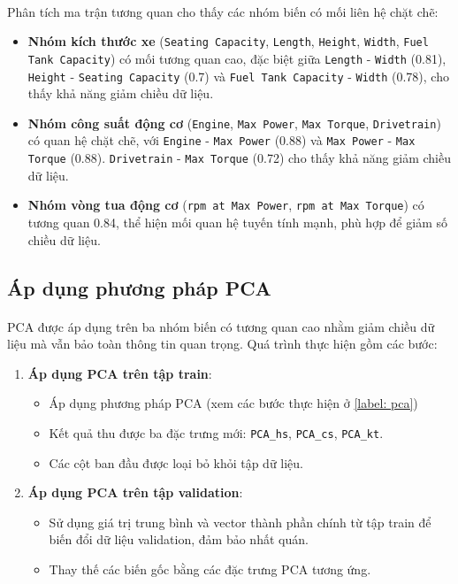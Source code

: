 \paragraph{}{Phân tích ma trận tương quan cho thấy các nhóm biến có mối liên hệ chặt chẽ:}
\begin{itemize}
    \item \textbf{Nhóm kích thước xe} (\texttt{Seating Capacity}, \texttt{Length}, \texttt{Height}, \texttt{Width}, \texttt{Fuel Tank Capacity}) có mối tương quan cao, đặc biệt giữa \texttt{Length} - \texttt{Width} (0.81), \texttt{Height} - \texttt{Seating Capacity} (0.7) và \texttt{Fuel Tank Capacity} - \texttt{Width} (0.78), cho thấy khả năng giảm chiều dữ liệu.
    \item \textbf{Nhóm công suất động cơ} (\texttt{Engine}, \texttt{Max Power}, \texttt{Max Torque}, \texttt{Drivetrain}) có quan hệ chặt chẽ, với \texttt{Engine} - \texttt{Max Power} (0.88) và \texttt{Max Power} - \texttt{Max Torque} (0.88). \texttt{Drivetrain} - \texttt{Max Torque} (0.72) cho thấy khả năng giảm chiều dữ liệu.
    \item \textbf{Nhóm vòng tua động cơ} (\texttt{rpm at Max Power}, \texttt{rpm at Max Torque}) có tương quan 0.84, thể hiện mối quan hệ tuyến tính mạnh, phù hợp để giảm số chiều dữ liệu.
\end{itemize}

\subsection{Áp dụng phương pháp PCA}
\label{label: PCA}
\label{subsec:apply_pca}

\paragraph{}{PCA được áp dụng trên ba nhóm biến có tương quan cao nhằm giảm chiều dữ liệu mà vẫn bảo toàn thông tin quan trọng. Quá trình thực hiện gồm các bước:}

\begin{enumerate}
    \item \textbf{Áp dụng PCA trên tập train}:
    \begin{itemize}
        \item Áp dụng phương pháp PCA (xem các bước thực hiện ở \ref{label: pca})
        \item Kết quả thu được ba đặc trưng mới: \texttt{PCA\_hs}, \texttt{PCA\_cs}, \texttt{PCA\_kt}.
        \item Các cột ban đầu được loại bỏ khỏi tập dữ liệu.
    \end{itemize}
    \item \textbf{Áp dụng PCA trên tập validation}:
    \begin{itemize}
        \item Sử dụng giá trị trung bình và vector thành phần chính từ tập train để biến đổi dữ liệu validation, đảm bảo nhất quán.
        \item Thay thế các biến gốc bằng các đặc trưng PCA tương ứng.
    \end{itemize}
\end{enumerate}

